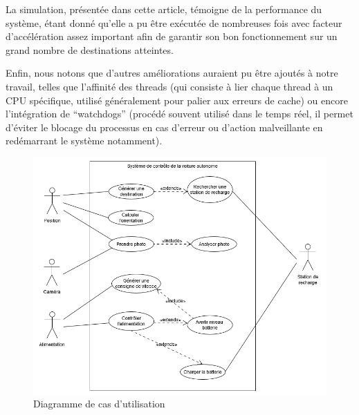 \documentclass[conference]{IEEEtran}
\begin{document}
La simulation, présentée dans cette article, témoigne de la performance du système, étant donné qu'elle a pu être exécutée de nombreuses fois avec facteur d'accélération assez important afin de garantir son bon fonctionnement sur un grand nombre de destinations atteintes. 

Enfin, nous notons que d'autres améliorations auraient pu être ajoutés à notre travail, telles que l'affinité des threads (qui consiste à lier chaque thread à un CPU spécifique, utilisé généralement pour palier aux erreurs de cache) ou encore l'intégration de \enquote{watchdogs} (procédé souvent utilisé dans le temps réel, il permet d'éviter le blocage du processus en cas d'erreur ou d'action malveillante en redémarrant le système notamment).


\onecolumn

\appendix 



\begin{figure}[h!]
    \centering
    \includegraphics[width=\linewidth]{usecase.png}
    \caption{Diagramme de cas d'utilisation}
    \label{fig:usecase}
\end{figure}
\end{document}
